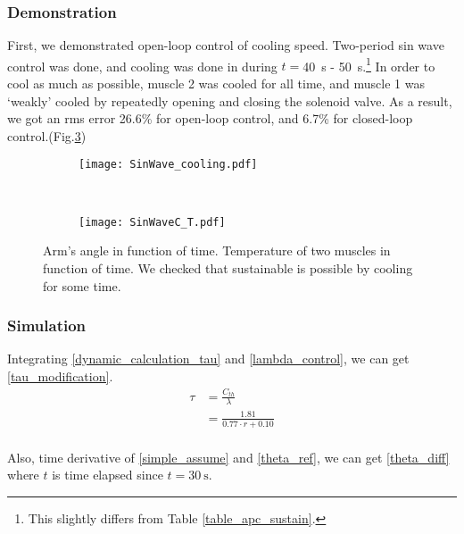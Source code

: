 \subsubsection{Demonstration}
First, we demonstrated open-loop control of cooling speed. Two-period sin wave control was done, and cooling was done in during $t=$\SI{40}{\second} - \SI{50}{\second}.\footnote{This slightly differs from Table \ref{table_apc_sustain}.} In order to cool as much as possible, muscle 2 was cooled for all time, and muscle 1 was `weakly' cooled by repeatedly opening and closing the solenoid valve. As a result, we got an rms error 26.6\% for open-loop control, and 6.7\% for closed-loop control.(Fig.\ref{sustain_demo})

\begin{figure}[t]
	\centering
	\begin{subfigure}[t]{0.47\textwidth}
		\texttt{[image: SinWave\_cooling.pdf]}
		\caption{\label{SinWave_cooling}}
	\end{subfigure}
	~
	\begin{subfigure}[t]{0.46\textwidth}
		\texttt{[image: SinWaveC\_T.pdf]}
		\caption{\label{Sinwave_C_T}}
	\end{subfigure}
	\caption[Sustainable open-loop \apc demonstration]{ Arm's angle in function of time.  Temperature of two muscles in function of time. We checked that sustainable \apc is possible by cooling for some time.}
	\label{sustain_demo}
\end{figure}

\subsubsection{Simulation}


Integrating \eqref{dynamic_calculation_tau} and \eqref{lambda_control}, we can get \eqref{tau_modification}.
\begin{equation} \label{tau_modification} 
\begin{aligned} 
\tau & = \frac{C_{th}}{\lambda} \\
& = \frac{1.81}{0.77\cdot r + 0.10} \\ 
\end{aligned}
\end{equation}

Also, time derivative of \eqref{simple_assume} and \eqref{theta_ref}, we can get \eqref{theta_diff} where $t$ is time elapsed since $t=\SI{30}{\second}$.

